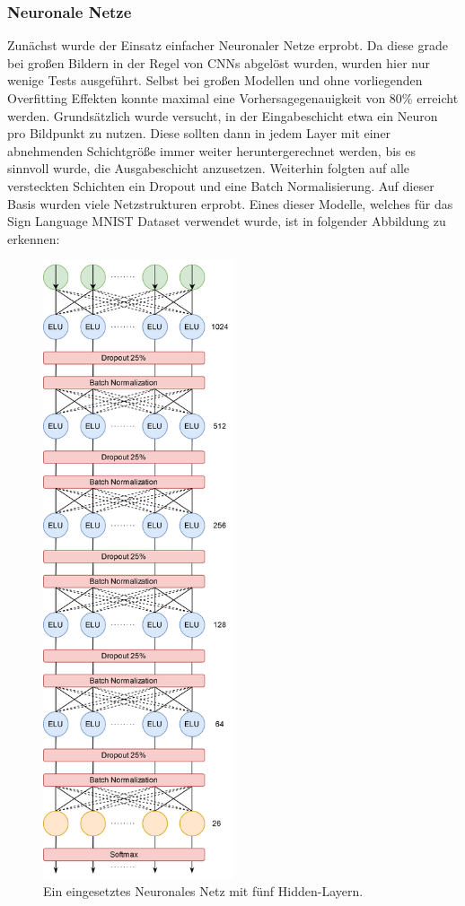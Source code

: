 \documentclass[11pt,bibliography=totocnumbered]{scrartcl}
\begin{document}
\subsubsection{Neuronale Netze}
\label{nntraining}
Zunächst wurde der Einsatz einfacher Neuronaler Netze erprobt. Da diese grade bei großen Bildern in der Regel von CNNs abgelöst wurden, wurden hier nur wenige Tests ausgeführt. Selbst bei großen Modellen und ohne vorliegenden Overfitting Effekten konnte maximal eine Vorhersagegenauigkeit von 80\% erreicht werden. Grundsätzlich wurde versucht, in der Eingabeschicht etwa ein Neuron pro Bildpunkt zu nutzen. Diese sollten dann in jedem Layer mit einer abnehmenden Schichtgröße immer weiter heruntergerechnet werden, bis es sinnvoll wurde, die Ausgabeschicht anzusetzen. Weiterhin folgten auf alle versteckten Schichten ein Dropout und eine Batch Normalisierung. Auf dieser Basis wurden viele Netzstrukturen erprobt. Eines dieser Modelle, welches für das Sign Language MNIST Dataset verwendet wurde, ist in folgender Abbildung zu erkennen: 
\begin{figure}[H]
	\centering
	\includegraphics[width=0.50\textwidth]{nn_1}
	\vspace*{-3mm}
	\caption[Eingesetztes Neuronales Netz mit fünf Hidden-Layern]{Ein eingesetztes Neuronales Netz mit fünf Hidden-Layern.}
	\label{fig:nn_1}
\end{figure}
\end{document}
